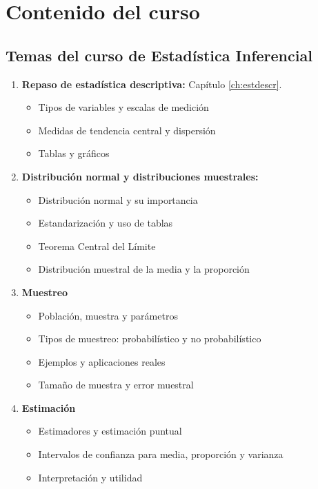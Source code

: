 \chapter{Contenido del curso}

\section*{Temas del curso de Estadística Inferencial}

\begin{enumerate}
    \item \textbf{Repaso de estadística descriptiva:} Capítulo \ref{ch:estdescr}.
    \begin{itemize}
        \item Tipos de variables y escalas de medición
        \item Medidas de tendencia central y dispersión
        \item Tablas y gráficos
    \end{itemize}
    \item \textbf{Distribución normal y distribuciones muestrales:}
    \begin{itemize}
        \item Distribución normal y su importancia
        \item Estandarización y uso de tablas
        \item Teorema Central del Límite
        \item Distribución muestral de la media y la proporción
    \end{itemize}
    \item \textbf{Muestreo}
    \begin{itemize}
        \item Población, muestra y parámetros
        \item Tipos de muestreo: probabilístico y no probabilístico
        \item Ejemplos y aplicaciones reales
        \item Tamaño de muestra y error muestral
    \end{itemize}
    \item \textbf{Estimación}
    \begin{itemize}
        \item Estimadores y estimación puntual
        \item Intervalos de confianza para media, proporción y varianza
        \item Interpretación y utilidad
    \end{itemize}

\end{enumerate}
